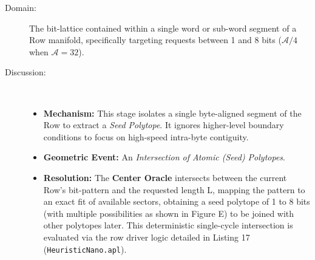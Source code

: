 \documentclass[11pt]{article}
\begin{document}
\begin{description}
    \item[Domain:] The bit-lattice contained within a single word or sub-word segment of a Row manifold, specifically targeting requests between 1 and 8 bits ($\mathcal{A}/4$ when $\mathcal{A}=32$).
    
    \item[Discussion:] \hfill \\
\begin{itemize}
    \item \textbf{Mechanism:} This stage isolates a single byte-aligned segment of the Row to extract a \textit{Seed Polytope}. It ignores higher-level boundary conditions to focus on high-speed intra-byte contiguity.
    
    \item \textbf{Geometric Event:} An \textit{Intersection of Atomic (Seed) Polytopes}.
    
    \item  \textbf{Resolution:} The \textbf{Center Oracle} intersects between the current Row's bit-pattern and the requested length L, mapping the pattern to an exact fit of available sectors, obtaining a seed polytope of 1 to 8 bits (with multiple possibilities as shown in Figure E) to be joined with other polytopes later. This deterministic single-cycle intersection is evaluated via the row driver logic detailed in Listing 17 (\texttt{HeuristicNano.apl}).
\end{itemize}
\end{description}
\end{document}
